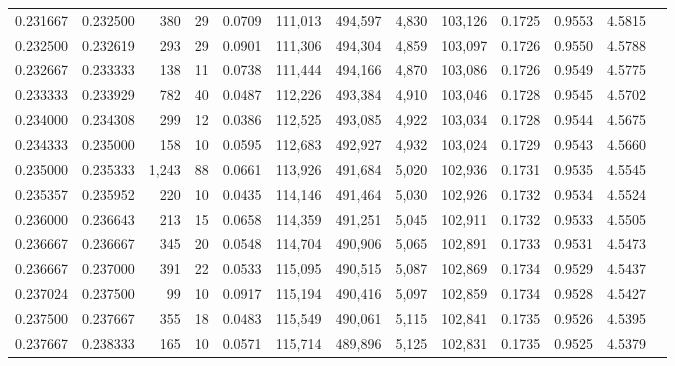 \begin{tabular}{rrrrrrrrrrrrr}
0.231667 & 0.232500 &   380 &  29 &                                     0.0709 & 111,013 & 494,597 &   4,830 & 103,126 & 0.1725 & 0.9553 & 4.5815 \\
0.232500 & 0.232619 &   293 &  29 &                                     0.0901 & 111,306 & 494,304 &   4,859 & 103,097 & 0.1726 & 0.9550 & 4.5788 \\
0.232667 & 0.233333 &   138 &  11 &                                     0.0738 & 111,444 & 494,166 &   4,870 & 103,086 & 0.1726 & 0.9549 & 4.5775 \\
0.233333 & 0.233929 &   782 &  40 &                                     0.0487 & 112,226 & 493,384 &   4,910 & 103,046 & 0.1728 & 0.9545 & 4.5702 \\
0.234000 & 0.234308 &   299 &  12 &                                     0.0386 & 112,525 & 493,085 &   4,922 & 103,034 & 0.1728 & 0.9544 & 4.5675 \\
0.234333 & 0.235000 &   158 &  10 &                                     0.0595 & 112,683 & 492,927 &   4,932 & 103,024 & 0.1729 & 0.9543 & 4.5660 \\
0.235000 & 0.235333 & 1,243 &  88 &                                     0.0661 & 113,926 & 491,684 &   5,020 & 102,936 & 0.1731 & 0.9535 & 4.5545 \\
0.235357 & 0.235952 &   220 &  10 &                                     0.0435 & 114,146 & 491,464 &   5,030 & 102,926 & 0.1732 & 0.9534 & 4.5524 \\
0.236000 & 0.236643 &   213 &  15 &                                     0.0658 & 114,359 & 491,251 &   5,045 & 102,911 & 0.1732 & 0.9533 & 4.5505 \\
0.236667 & 0.236667 &   345 &  20 &                                     0.0548 & 114,704 & 490,906 &   5,065 & 102,891 & 0.1733 & 0.9531 & 4.5473 \\
0.236667 & 0.237000 &   391 &  22 &                                     0.0533 & 115,095 & 490,515 &   5,087 & 102,869 & 0.1734 & 0.9529 & 4.5437 \\
0.237024 & 0.237500 &    99 &  10 &                                     0.0917 & 115,194 & 490,416 &   5,097 & 102,859 & 0.1734 & 0.9528 & 4.5427 \\
0.237500 & 0.237667 &   355 &  18 &                                     0.0483 & 115,549 & 490,061 &   5,115 & 102,841 & 0.1735 & 0.9526 & 4.5395 \\
0.237667 & 0.238333 &   165 &  10 &                                     0.0571 & 115,714 & 489,896 &   5,125 & 102,831 & 0.1735 & 0.9525 & 4.5379 \\

\end{tabular}
